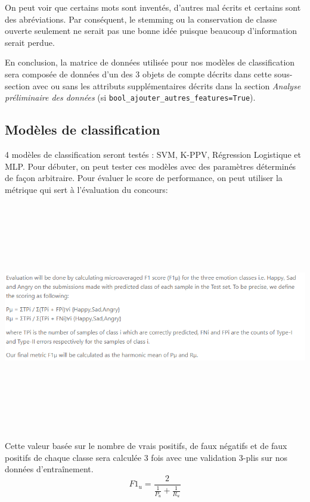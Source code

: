 \documentclass[12pt,french]{article}
\begin{document}
On peut voir que certains mots sont inventés, d'autres mal écrits et certains sont des abréviations. Par conséquent, le stemming ou la conservation de classe ouverte seulement ne serait pas une bonne idée puisque beaucoup d'information serait perdue.

En conclusion, la matrice de données utilisée pour nos modèles de classification sera composée de données d'un des 3 objets de compte décrits dans cette sous-section avec ou sans les attributs supplémentaires décrits dans la section \emph{Analyse préliminaire des données} (si \verb|bool_ajouter_autres_features=True|).

\subsection*{Modèles de classification}
4 modèles de classification seront testés : SVM, K-PPV, Régression Logistique et MLP. Pour débuter, on peut tester ces modèles avec des paramètres déterminés de façon arbitraire. Pour évaluer le score de performance, on peut utiliser la métrique qui sert à l'évaluation du concours:

\includegraphics[width=\linewidth,height=10cm,keepaspectratio]{metric_concour}

Cette valeur basée sur le nombre de vrais positifs, de faux négatifs et de faux positifs de chaque classe sera calculée 3 fois avec une validation 3-plis sur nos données d'entraînement.
\begin{equation}
F1_{u} =\frac{2}{\frac{1}{P_{u}}+\frac{1}{R_{u}}}
\end{equation}
\end{document}
